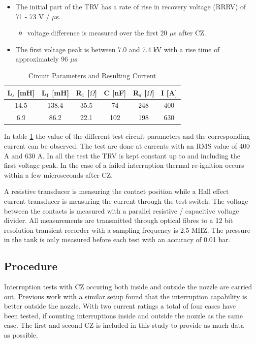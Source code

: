 \documentclass[10pt,a4paper]{article}
\begin{document}
\begin{itemize}
\item The initial part of the TRV has a rate of rise in recovery voltage (RRRV) of 71 - 73 V / $\mu$s.
	\begin{itemize}
		\item voltage difference is measured over the first 20 $\mu$s after CZ.
	\end{itemize}
\item The first voltage peak is between 7.0 and 7.4 kV with a rise time of approximately 96 $\mu$s
\end{itemize}

\begin{table}[H]
\center
\caption{Circuit Parameters and Resulting Current \cite{bib:AFIMVLBA} }
\begin{tabular}{|c|c|c|c|c|c|}
\hline 
L$_s$ [mH] & L$_1$ [mH] & R$_1$ [$\Omega$] & C [nF] & R$_{d}$ [$\Omega$] & I [A] \\ 
\hline 
14.5 & 138.4 & 35.5 & 74 & 248 & 400 \\ 
\hline 
6.9 & 86.2 & 22.1 & 102 & 198 & 630 \\ 
\hline 
\end{tabular} 
\label{tab:testParameters}
\end{table}

In table \ref{tab:testParameters} the value of the different test circuit parameters and the corresponding current can be observed. The test are done at currents with an RMS value of 400 A and 630 A. In all the test the TRV is kept constant up to and including the first voltage peak. In the case of a failed interruption thermal re-ignition occurs within a few microseconds after CZ.

A resistive transducer is measuring the contact position while a Hall effect current transducer is measuring the current through the test switch. The voltage between the contacts is measured with a parallel resistive / capacitive voltage divider. All measurements are transmitted through optical fibres to a 12 bit resolution transient recorder with a sampling frequency is 2.5 MHZ. The pressure in the tank is only measured before each test with an accuracy of 0.01 bar.

\subsection{Procedure} \label{sec:procedure}
Interruption tests with CZ occuring both inside and outside the nozzle are carried out. Previous work with a similar setup found that the interruption capability is better outside the nozzle. With two current ratings a total of four cases have been tested, if counting interruptions inside and outside the nozzle as the same case. The first and second CZ is included in this study to provide as much data as possible.
\end{document}
